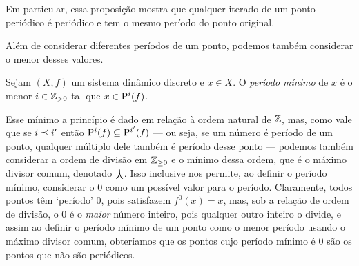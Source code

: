Em particular, essa proposição mostra que qualquer iterado de um ponto periódico é periódico e tem o mesmo período do ponto original.

Além de considerar diferentes períodos de um ponto, podemos também considerar o menor desses valores.

\begin{definition}
Sejam $(X,f)$ um sistema dinâmico discreto e $x \in X$. O \emph{período mínimo} de $x$ é o menor $i \in \Z_{>0}$ tal que $x \in \Per[i](f)$.
\end{definition}

Esse mínimo a princípio é dado em relação à ordem natural de $\Z$, mas, como vale que se $i \dleq i'$ então $\Per[i](f) \subseteq \Per[i'](f)$ --- ou seja, se um número é período de um ponto, qualquer múltiplo dele também é período desse ponto --- podemos também considerar a ordem de divisão em $\Z_{\geq 0}$ e o mínimo dessa ordem, que é o máximo divisor comum, denotado $\mdc$. Isso inclusive nos permite, ao definir o período mínimo, considerar o $0$ como um possível valor para o período. Claramente, todos pontos têm `período' $0$, pois satisfazem $f^0(x) = x$, mas, sob a relação de ordem de divisão, o $0$ é o \textit{maior} número inteiro, pois qualquer outro inteiro o divide, e assim ao definir o período mínimo de um ponto como o menor período usando o máximo divisor comum, obteríamos que os pontos cujo período mínimo é $0$ são os pontos que não são periódicos.




